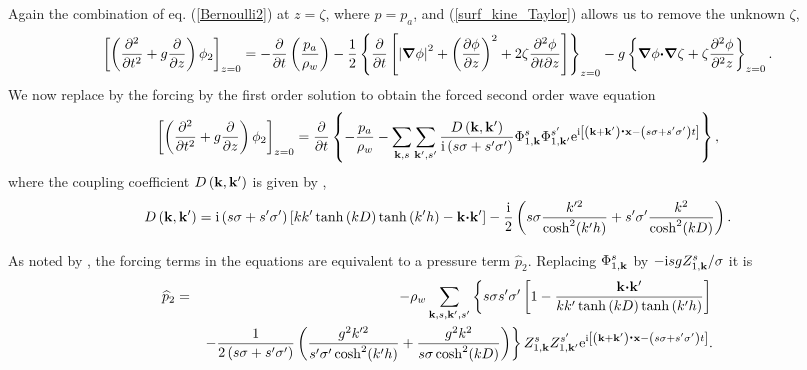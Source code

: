 Again the combination of eq. (\ref{Bernoulli2}) at $z=\zeta$, where $p=p_a$, and (\ref{surf_kine_Taylor}) allows us to remove the unknown $\zeta$, 
\begin{equation}
\left[\left(\frac{\partial ^{2}}{\partial t^{2}}
    +g \frac{\partial }{\partial z}\right) \phi_2\right]_{z=0}
    =-\frac{ \partial }{\partial t}\left(\frac{p_a}{\rho_w}\right) - \frac{1}{2} \left\{\frac{\partial }{\partial t}\left[
\left|\mbox{\boldmath $\nabla$} \phi\right|^2     +\left(\frac{\partial \phi}{\partial z}\right)^2 +2 \zeta \frac{\partial^2 \phi}{\partial t \partial z}\right]
\right\}_{z=0} - g \left\{\mbox{\boldmath $\nabla$}  \phi \mbox{\boldmath $\cdot$}  \mbox{\boldmath $\nabla$} \zeta +  \zeta \frac{\partial^2 \phi}{\partial^2 z}\right\}_{z=0}. 
\end{equation}
We now replace by the forcing by the first order solution to obtain the forced second order wave equation
\begin{equation}
\left[\left(\frac{\partial ^{2}}{\partial t^{2}}
    +g \frac{\partial }{\partial z}\right) \phi_2\right]_{z=0}
    =\frac{ \partial }{\partial t}\left\{ -\frac{p_a}{\rho_w} - \sum_{\mathbf{k},s} \sum_{\mathbf{k^{\prime}},s'} \frac{D\left(\mathbf{k},\mathbf{k^{\prime}}\right)}{{\mathrm i} \left(s \sigma+s' \sigma'\right)}
    \Phi _{1,\mathbf{k}}^{s}\Phi _{1,\mathbf{k^{\prime}}}^{s'} \mathrm{e}^{\mathrm{i}
    \left[\left(\mathbf{k}+\mathbf{k^{\prime}}\right)\mbox{\boldmath $\cdot$}{\mathbf x} - \left(s \sigma+s' \sigma'   \right) t\right]}\right\},\label{surface_2c}
\end{equation}
where the coupling coefficient  $D\left(\mathbf{k},{\mathbf
k'}\right)$ is given by  \cite{Hasselmann1962}, 
\begin{equation}
     D\left(\mathbf{k},\mathbf{k^{\prime}}\right) = 
    {\mathrm i} \left(s \sigma+s' \sigma'\right)
    \left[k k' \tanh \left(kD \right)
    \tanh \left(k' h\right)-\mathbf{k} \mbox{\boldmath $\cdot$} \mathbf{k^{\prime}} \right]-\frac{\mathrm{i}}{2} \left(s \sigma \frac{k'^2}{\cosh^2(k'h)}+s' \sigma' \frac{k^2}{\cosh^2(kD)}\right).\label{D_coupling2nd_order}
\end{equation}


As noted by  \cite{Hasselmann1963c}, the forcing terms in the equations are equivalent to a pressure term $\widehat{p}_2$.  Replacing   
$\Phi _{1,\mathbf{k}}^{s}$ by $-\mathrm{i} s g   Z_{1,\mathbf{k}}^{s}/\sigma$ it is  
\begin{eqnarray}
     \widehat{p}_2 &=& -\rho_w \sum_{\mathbf{k},s,\mathbf{k^{\prime}},s'}     
      \left\{ s \sigma s' \sigma' \left[1 - \frac{\mathbf{k} \mbox{\boldmath $\cdot$} \mathbf{k^{\prime}}}{k k'  \tanh \left(kD \right)
    \tanh \left(k' h\right)} \right] \right. \nonumber\\
    & &\left. -\frac{1}{2 \left(s \sigma+s' \sigma'\right)} 
\left(\frac{g^2 k'^2}{s' \sigma' \cosh^2(k'h)}+\frac{g^2 k^2}{s \sigma \cosh^2(kD)}\right)\right\}
    Z_{1,\mathbf{k}}^{s} Z_{1,\mathbf{k^{\prime}}}^{s'} \mathrm{e}^{\mathrm{i}
    \left[\left(\mathbf{k}+\mathbf{k^{\prime}}\right)\mbox{\boldmath $\cdot$}{\mathbf x} - \left(s \sigma+s' \sigma'   \right) t\right]}.\label{eq:p2surf}
\end{eqnarray}


